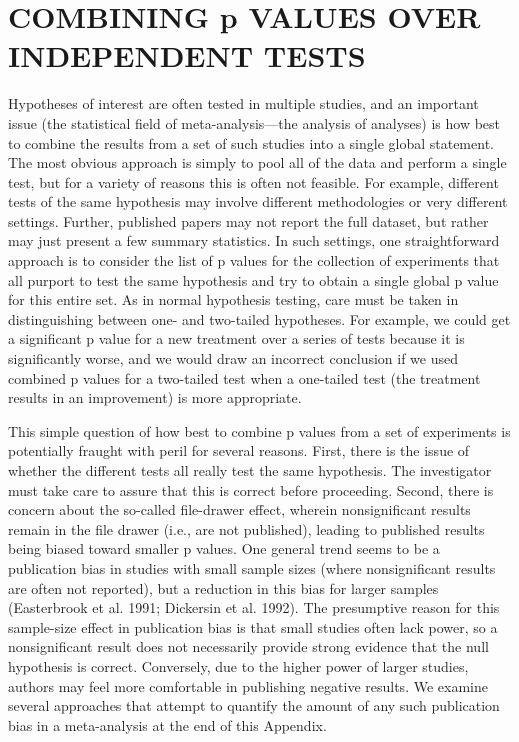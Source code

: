 \documentclass{article}
\begin{document}
\section{COMBINING p VALUES OVER INDEPENDENT TESTS}
Hypotheses of interest are often tested in multiple studies, and an important issue (the statistical field of meta-analysis—the analysis of analyses) is how best to combine the results from a set of such studies into a single global statement. The most obvious approach is simply to pool all of the data and perform a single test, but for a variety of reasons this is often not feasible. For example, different tests of the same hypothesis may involve different methodologies or very different settings. Further, published papers may not report the full dataset, but rather may just present a few summary statistics. In such settings, one straightforward approach is to consider the list of p values for the collection of experiments that all purport to test the same hypothesis and try to obtain a single global p value for this entire set. As in normal hypothesis testing, care must be taken in distinguishing between one- and two-tailed hypotheses. For example, we could get a significant p value for a new treatment over a series of tests because it is significantly worse, and we would draw an incorrect conclusion if we used combined p values for a two-tailed test when a one-tailed test (the treatment results in an improvement) is more appropriate.

This simple question of how best to combine p values from a set of experiments is potentially fraught with peril for several reasons. First, there is the issue of whether the different tests all really test the same hypothesis. The investigator must take care to assure that this is correct before proceeding. Second, there is concern about the so-called file-drawer effect, wherein nonsignificant results remain in the file drawer (i.e., are not published), leading to published results being biased toward smaller p values. One general trend seems to be a publication bias in studies with small sample sizes (where nonsignificant results are often not reported), but a reduction in this bias for larger samples (Easterbrook et al. 1991; Dickersin et al. 1992). The presumptive reason for this sample-size effect in publication bias is that small studies often lack power, so a nonsignificant result does not necessarily provide strong evidence that the null hypothesis is correct. Conversely, due to the higher power of larger studies, authors may feel more comfortable in publishing negative results. We examine several approaches that attempt to quantify the amount of any such publication bias in a meta-analysis at the end of this Appendix.
\end{document}
